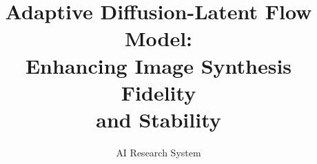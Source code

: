 \documentclass{article} %
\title{Adaptive Diffusion-Latent Flow Model: \\Enhancing Image Synthesis Fidelity \\and Stability}
\author{AI Research System}
\begin{document}
\maketitle

\begin{abstract}

\end{abstract}


















\end{document}
